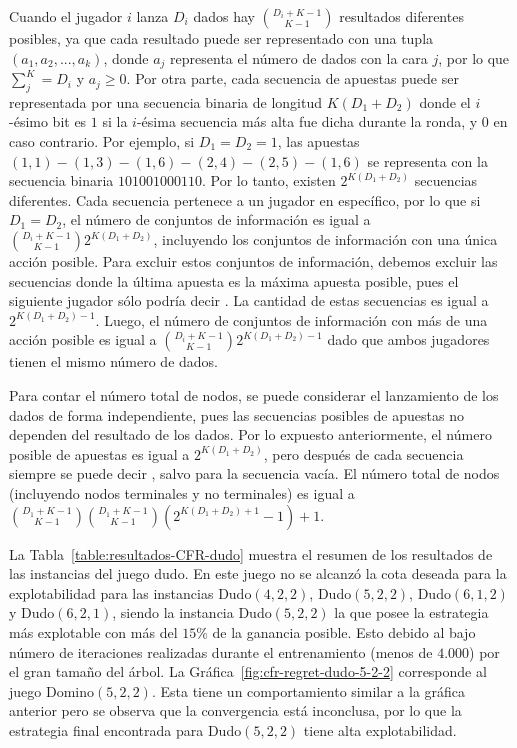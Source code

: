 Cuando el jugador $i$ lanza $D_i$ dados hay $\binom{D_i+K-1}{K-1}$ resultados diferentes posibles, ya que cada resultado puede ser representado con una tupla $(a_1, a_2, ..., a_k)$, donde $a_j$ representa el número de dados con la cara $j$, por lo que $\sum_j^K = D_i$ y $a_j \geq 0$. Por otra parte, cada secuencia de apuestas puede ser representada por una secuencia binaria de longitud $K(D_1 + D_2)$ donde el $i$-ésimo bit es $1$ si la $i$-ésima secuencia más alta fue dicha durante la ronda, y $0$ en caso contrario. Por ejemplo, si $D_1 = D_2 = 1$, las apuestas $(1, 1)-(1, 3)-(1, 6)-(2, 4)-(2, 5)-(1, 6)$ se representa con la secuencia binaria $101001000110$. Por lo tanto, existen $2^{K(D_1 + D_2)}$ secuencias diferentes. Cada secuencia pertenece a un jugador en específico, por lo que si $D_1 = D_2$, el número de conjuntos de información es igual a  $\binom{D_i+K-1}{K-1}2^{K(D_1 + D_2)}$, incluyendo los conjuntos de información con una única acción posible. Para excluir estos conjuntos de información, debemos excluir las secuencias donde la última apuesta es la máxima apuesta posible, pues el siguiente jugador sólo podría decir . La cantidad de estas secuencias es igual a $2^{K(D_1 + D_2)-1}$. Luego, el número de conjuntos de información con más de una acción posible es igual a $\binom{D_i+K-1}{K-1}2^{K(D_1 + D_2)-1}$ dado que ambos jugadores tienen el mismo número de dados.

Para contar el número total de nodos, se puede considerar el lanzamiento de los dados de forma independiente, pues las secuencias posibles de apuestas no dependen del resultado de los dados. Por lo expuesto anteriormente, el número posible de apuestas es igual a $2^{K(D_1+D_2)}$, pero después de cada secuencia siempre se puede decir , salvo para la secuencia vacía. El número total de nodos (incluyendo nodos terminales y no terminales) es igual a $\binom{D_1+K-1}{K-1}\binom{D_1+K-1}{K-1}(2^{K(D_1+D_2)+1}-1)+1$.

La Tabla~\ref{table:resultados-CFR-dudo} muestra el resumen de los resultados de las instancias del juego dudo. En este juego no se alcanzó la cota deseada para la explotabilidad para las instancias Dudo$(4, 2, 2)$, Dudo$(5, 2, 2)$, Dudo$(6, 1, 2)$ y Dudo$(6, 2, 1)$, siendo la instancia Dudo$(5, 2, 2)$ la que posee la estrategia más explotable con más del $15\%$ de la ganancia posible. Esto debido al bajo número de iteraciones realizadas durante el entrenamiento (menos de $4.000$) por el gran tamaño del árbol. La Gráfica~\ref{fig:cfr-regret-dudo-5-2-2} corresponde al juego Domino$(5, 2, 2)$. Esta tiene un comportamiento similar a la gráfica anterior pero se observa que la convergencia está inconclusa, por lo que la estrategia final encontrada para Dudo$(5, 2, 2)$ tiene alta explotabilidad.

